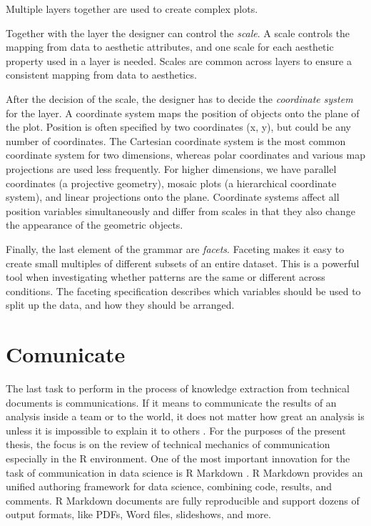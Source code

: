 \documentclass[]{book}
\theoremstyle{definition}
\theoremstyle{definition}
\theoremstyle{definition}
\theoremstyle{remark}
\begin{document}
Multiple layers together are used to create complex plots.

Together with the layer the designer can control the \emph{scale}. A
scale controls the mapping from data to aesthetic attributes, and one
scale for each aesthetic property used in a layer is needed. Scales are
common across layers to ensure a consistent mapping from data to
aesthetics.

After the decision of the scale, the designer has to decide the
\emph{coordinate system} for the layer. A coordinate system maps the
position of objects onto the plane of the plot. Position is often
specified by two coordinates (x, y), but could be any number of
coordinates. The Cartesian coordinate system is the most common
coordinate system for two dimensions, whereas polar coordinates and
various map projections are used less frequently. For higher dimensions,
we have parallel coordinates (a projective geometry), mosaic plots (a
hierarchical coordinate system), and linear projections onto the plane.
Coordinate systems affect all position variables simultaneously and
differ from scales in that they also change the appearance of the
geometric objects.

Finally, the last element of the grammar are \emph{facets}. Faceting
makes it easy to create small multiples of different subsets of an
entire dataset. This is a powerful tool when investigating whether
patterns are the same or different across conditions. The faceting
specification describes which variables should be used to split up the
data, and how they should be arranged.

\section{Comunicate}\label{sotatoolscomunicate}

The last task to perform in the process of knowledge extraction from
technical documents is communications. If it means to communicate the
results of an analysis inside a team or to the world, it does not matter
how great an analysis is unless it is impossible to explain it to others
\citep{wickham2016r}. For the purposes of the present thesis, the focus
is on the review of technical mechanics of communication especially in
the R \citep{R-base} environment. One of the most important innovation
for the task of communication in data science is R Markdown
\citep{R-rmarkdown}. R Markdown provides an unified authoring framework
for data science, combining code, results, and comments. R Markdown
documents are fully reproducible and support dozens of output formats,
like PDFs, Word files, slideshows, and more.
\end{document}
